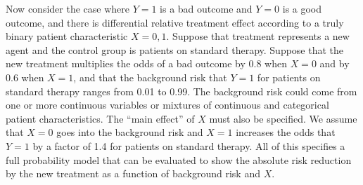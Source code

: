 Now consider the case 
where $Y=1$ is a bad outcome and $Y=0$ is a good outcome, and there is
differential relative treatment effect according to a truly binary
patient characteristic $X=0,1$.  Suppose that treatment represents a
new agent and the control group is patients on standard therapy.
Suppose that the new treatment multiplies the odds of a bad outcome by
0.8 when $X=0$ and by 0.6 when $X=1$, and that the background risk
that $Y=1$ for patients on standard therapy ranges from 0.01 to 0.99.
The background risk could come from one or more continuous variables
or mixtures of continuous and categorical patient characteristics.
The ``main effect'' of $X$ must also be specified.  We assume that
$X=0$ goes into the background risk and $X=1$ increases the odds that
$Y=1$ by a factor of 1.4 for patients on standard therapy.
All of this specifies a full probability model that can be evaluated
to show the absolute risk reduction by the new treatment as a function
of background risk and $X$.

